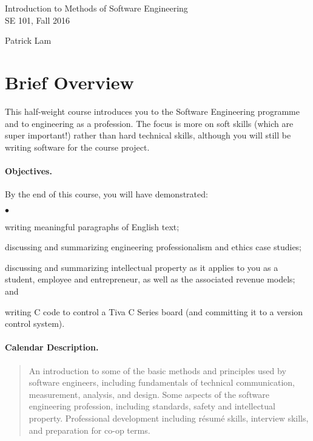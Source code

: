 \documentclass[11pt,onecolumn]{article}
\newcommand{\squishlist}{
 \begin{list}{$\bullet$}
  { \setlength{\itemsep}{0pt}
     \setlength{\parsep}{3pt}
     \setlength{\topsep}{3pt}
     \setlength{\partopsep}{0pt}
     \setlength{\leftmargin}{1.5em}
     \setlength{\labelwidth}{1em}
     \setlength{\labelsep}{0.5em} } }
\newcommand{\squishend}{
  \end{list}  }
\begin{document}
\pagestyle{empty}

\renewcommand{\arraystretch}{0.92}

\begin{center}
\begin{Large}
Introduction to Methods of Software Engineering\\
SE 101, Fall 2016\\[1em]
\end{Large}

\begin{large}
Patrick Lam
\end{large}
\end{center}

\section*{Brief Overview}
This half-weight course introduces you to the Software Engineering programme and to engineering as a profession. The focus is more on soft skills (which are super important!) rather than hard technical skills, although you will still be writing software for the course project.

\paragraph{Objectives.}
By the end of this course, you will have demonstrated:
\squishlist
\item writing meaningful paragraphs of English text;
\item discussing and summarizing engineering professionalism and ethics case studies;
\item discussing and summarizing intellectual property as it applies to you as a student, employee and entrepreneur, as well as the associated revenue models; and
\item writing C code to control a Tiva C Series board (and committing it to a version control system).
\squishend

\paragraph{Calendar Description.}
\begin{quote}
    An introduction to some of the basic methods and principles used by software engineers, including fundamentals of technical communication, measurement, analysis, and design. Some aspects of the software engineering profession, including standards, safety and intellectual property. Professional development including r\'esum\'e skills, interview skills, and preparation for co-op terms.
\end{quote}
\end{document}
